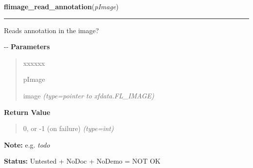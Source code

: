 \hspace{.8\funcindent}\begin{boxedminipage}{\funcwidth}

    \raggedright \textbf{flimage\_read\_annotation}(\textit{pImage})

    \vspace{-1.5ex}

    \rule{\textwidth}{0.5\fboxrule}
\setlength{\parskip}{2ex}

Reads annotation in the image?

-{}-
\setlength{\parskip}{1ex}
      \textbf{Parameters}
      \vspace{-1ex}

      \begin{quote}
        \begin{Ventry}{xxxxxx}

          \item[pImage]


image
            {\it (type=pointer to xfdata.FL\_IMAGE)}

        \end{Ventry}

      \end{quote}

      \textbf{Return Value}
    \vspace{-1ex}

      \begin{quote}

0, or -1 (on failure)
      {\it (type=int)}

      \end{quote}

\textbf{Note:} 
e.g. \emph{todo}


\textbf{Status:} 
Untested + NoDoc + NoDemo = NOT OK


    \end{boxedminipage}

    \label{xformslib:flflimage:flimage_replace_image}

    \vspace{0.5ex}

